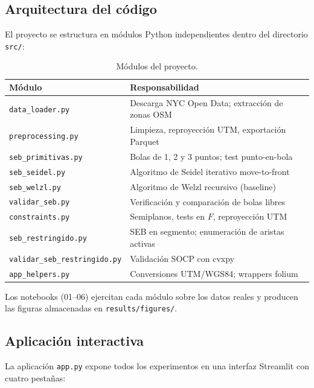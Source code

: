 \documentclass[11pt,a4paper]{article}
\theoremstyle{definition}
\theoremstyle{remark}
\begin{document}
\subsection{Arquitectura del código}

El proyecto se estructura en módulos Python independientes dentro del
directorio \texttt{src/}:

\begin{table}[ht]
\centering
\caption{Módulos del proyecto.}
\label{tab:modulos}
\begin{tabular}{ll}
\toprule
\textbf{Módulo} & \textbf{Responsabilidad} \\
\midrule
\texttt{data\_loader.py}       & Descarga NYC Open Data; extracción de zonas OSM \\
\texttt{preprocessing.py}      & Limpieza, reproyección UTM, exportación Parquet \\
\texttt{seb\_primitivas.py}    & Bolas de 1, 2 y 3 puntos; test punto-en-bola \\
\texttt{seb\_seidel.py}        & Algoritmo de Seidel iterativo move-to-front \\
\texttt{seb\_welzl.py}         & Algoritmo de Welzl recursivo (baseline) \\
\texttt{validar\_seb.py}       & Verificación y comparación de bolas libres \\
\texttt{constraints.py}        & Semiplanos, tests en $F$, reproyección UTM \\
\texttt{seb\_restringido.py}   & SEB en segmento; enumeración de aristas activas \\
\texttt{validar\_seb\_restringido.py} & Validación SOCP con cvxpy \\
\texttt{app\_helpers.py}       & Conversiones UTM/WGS84; wrappers folium \\
\bottomrule
\end{tabular}
\end{table}

Los notebooks (01--06) ejercitan cada módulo sobre los datos reales y
producen las figuras almacenadas en \texttt{results/figures/}.

\subsection{Aplicación interactiva}

La aplicación \texttt{app.py} expone todos los experimentos en una interfaz
Streamlit con cuatro pestañas:
\end{document}
